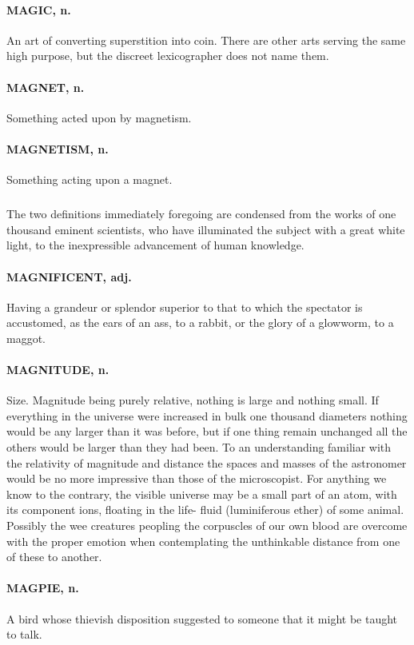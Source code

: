 \documentclass[11pt]{article}
\begin{document}
\paragraph{MAGIC, n.}  An art of converting superstition into coin.  There are
other arts serving the same high purpose, but the discreet
lexicographer does not name them.

\paragraph{MAGNET, n.}  Something acted upon by magnetism.

\paragraph{MAGNETISM, n.}  Something acting upon a magnet.
\subparagraph{}   The two definitions immediately foregoing are condensed from the
works of one thousand eminent scientists, who have illuminated the
subject with a great white light, to the inexpressible advancement of
human knowledge.

\paragraph{MAGNIFICENT, adj.}  Having a grandeur or splendor superior to that to
which the spectator is accustomed, as the ears of an ass, to a rabbit,
or the glory of a glowworm, to a maggot.

\paragraph{MAGNITUDE, n.}  Size.  Magnitude being purely relative, nothing is
large and nothing small.  If everything in the universe were increased
in bulk one thousand diameters nothing would be any larger than it was
before, but if one thing remain unchanged all the others would be
larger than they had been.  To an understanding familiar with the
relativity of magnitude and distance the spaces and masses of the
astronomer would be no more impressive than those of the microscopist.
For anything we know to the contrary, the visible universe may be a
small part of an atom, with its component ions, floating in the life-
fluid (luminiferous ether) of some animal.  Possibly the wee creatures
peopling the corpuscles of our own blood are overcome with the proper
emotion when contemplating the unthinkable distance from one of these
to another.

\paragraph{MAGPIE, n.}  A bird whose thievish disposition suggested to someone
that it might be taught to talk.
\end{document}
